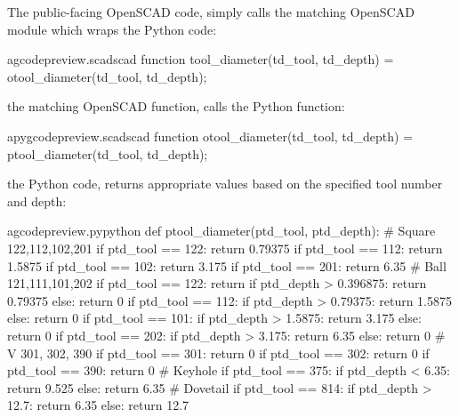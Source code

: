 \documentclass{ltxdoc}
\begin{document}
The public-facing OpenSCAD code, 
simply calls the matching OpenSCAD module which wraps the Python code:
 
\lstset{firstnumber=\thegcpscad}
\begin{writecode}{a}{gcodepreview.scad}{scad}
function tool_diameter(td_tool, td_depth) = otool_diameter(td_tool, td_depth);

\end{writecode}
\addtocounter{gcpscad}{2}

\noindent the matching OpenSCAD function,  
calls the Python function:

\lstset{firstnumber=\thepyscad}
\begin{writecode}{a}{pygcodepreview.scad}{scad}
function otool_diameter(td_tool, td_depth) = ptool_diameter(td_tool, td_depth);

\end{writecode}
\addtocounter{pyscad}{2}
 
\noindent the Python code,  returns 
appropriate values based on the specified tool number and depth:
 
\lstset{firstnumber=\thegcpy}
\begin{writecode}{a}{gcodepreview.py}{python}
def ptool_diameter(ptd_tool, ptd_depth):
# Square 122,112,102,201
    if ptd_tool == 122:
        return 0.79375
    if ptd_tool == 112:
        return 1.5875
    if ptd_tool == 102:
        return 3.175
    if ptd_tool == 201:
        return 6.35
# Ball 121,111,101,202
    if ptd_tool == 122:
        return 
        if ptd_depth > 0.396875:
            return 0.79375
        else:
            return 0
    if ptd_tool == 112:
        if ptd_depth > 0.79375:
            return 1.5875
        else:
            return 0
    if ptd_tool == 101:
        if ptd_depth > 1.5875:
            return 3.175
        else:
            return 0
    if ptd_tool == 202:
        if ptd_depth > 3.175:
            return 6.35
        else:
            return 0
# V 301, 302, 390
    if ptd_tool == 301:
        return 0
    if ptd_tool == 302:
        return 0
    if ptd_tool == 390:
        return 0
# Keyhole
    if ptd_tool == 375:
        if ptd_depth < 6.35:
            return 9.525
        else:
            return 6.35
# Dovetail
    if ptd_tool == 814:
        if ptd_depth > 12.7:
            return 6.35
        else:
            return 12.7

\end{writecode}
\addtocounter{gcpy}{32}
\end{document}
